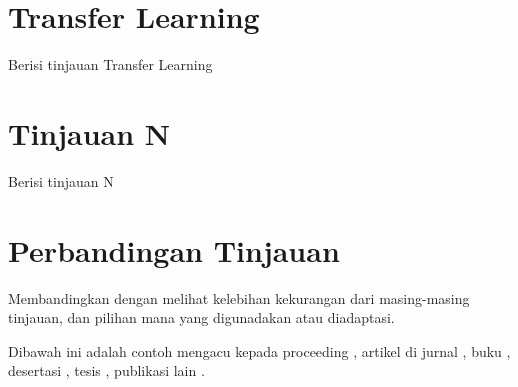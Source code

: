\section{Transfer Learning\label{sec:2-TransferLearning}}
Berisi tinjauan Transfer Learning

\section{Tinjauan N \label{sec:2-TinjauanN}}
Berisi tinjauan N

\section{Perbandingan Tinjauan \label{sec2-Banding}}
Membandingkan dengan melihat kelebihan kekurangan dari masing-masing tinjauan, dan pilihan mana 
yang digunadakan atau diadaptasi.

Dibawah ini adalah contoh mengacu kepada proceeding \cite{Ding:2005}, artikel di jurnal 
\cite{Bishr98}, buku \cite{Sheth:b}, desertasi \cite{Hoschek:2002}, tesis \cite{Kantere:2002}, 
publikasi lain \cite{Farias:a}.

